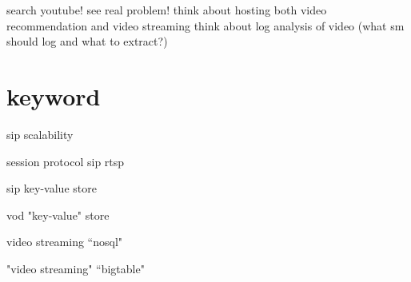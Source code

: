 \documentclass[•]{article}
\begin{document}
search youtube! see real problem!
think about hosting both video recommendation and video streaming
think about log analysis of video (what sm should log and what to extract?)



\section{keyword}

sip scalability

session protocol sip rtsp

sip key-value store

vod "key-value" store

video streaming “nosql"

"video streaming" “bigtable"




\end{document}
